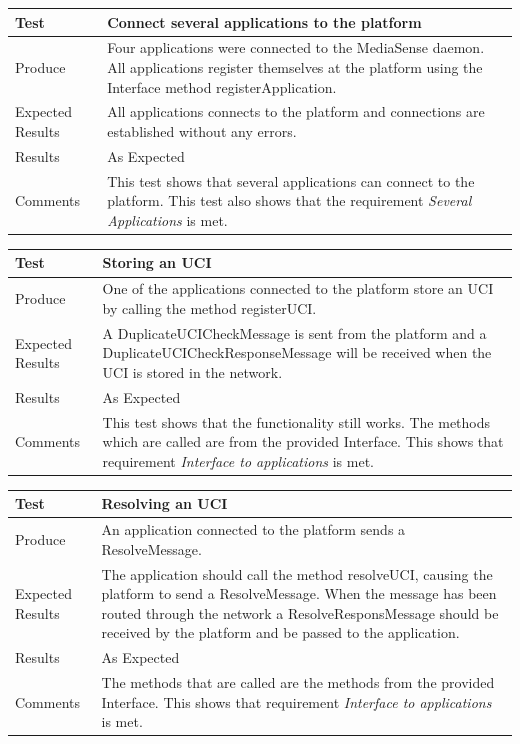 \begin{center}
    \begin{tabular}{ | l | p{12cm} |}
    \hline
    Test 	 				& 		 Connect several applications to the platform\\ \hline
	Produce  				& 		 Four applications were connected to the MediaSense daemon. All applications register themselves at the platform using the Interface method registerApplication.\\ \hline
	Expected Results  		& 		 All applications connects to the platform and connections are established without any errors.\\ \hline
	Results 				& 		 As Expected\\ \hline
	Comments				& 		 This test shows that several applications can connect to the platform. This test also shows that the requirement \emph{Several Applications} is met.\\ \hline
    \end{tabular}
\end{center}

\begin{center}
    \begin{tabular}{ | l | p{12cm} |}
    \hline
    Test 	 				& 		 Storing an UCI\\ \hline
	Produce  				& 		 One of the applications connected to the platform store an UCI by calling the method registerUCI.\\ \hline
	Expected Results  		& 		 A DuplicateUCICheckMessage is sent from the platform and a DuplicateUCICheckResponseMessage will be received when the UCI is stored in the network.\\ \hline
	Results 				& 		 As Expected\\ \hline
	Comments				& 		 This test shows that the functionality still works. The methods which are called are from the provided Interface. This shows that requirement \emph{Interface to applications} is met.\\ \hline
    \end{tabular}
\end{center}

\begin{center}
    \begin{tabular}{ | l | p{12cm} |}
    \hline
    Test 	 				& 		 Resolving an UCI\\ \hline
	Produce  				& 		 An application connected to the platform sends a ResolveMessage.\\ \hline
	Expected Results  		& 		 The application should call the method resolveUCI, causing the platform to send a ResolveMessage. When the message has been routed through the network a ResolveResponsMessage should be received by the platform and be passed to the application. \\ \hline
	Results 				& 		 As Expected\\ \hline
	Comments				& 		 The methods that are called are the methods from the provided Interface. This shows that requirement \emph{Interface to applications} is met.\\ \hline
    \end{tabular}
\end{center}

